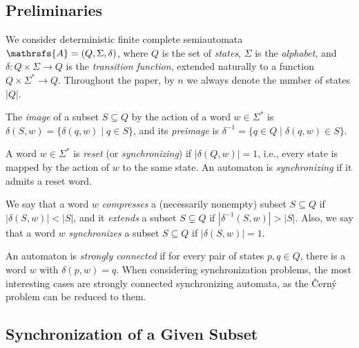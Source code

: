 
\newcommand{\Cerny}{\v{C}ern{\'y}\xspace}
\newtheorem{theorem}{Theorem}
\newtheorem{conjecture}[theorem]{Conjecture}

\subsection{Preliminaries}

We consider deterministic finite complete semiautomata $\mathrsfs{A}=(Q,\Sigma,\delta)$, where $Q$ is the set of \emph{states}, $\Sigma$ is the \emph{alphabet}, and $\delta\colon Q \times \Sigma \to Q$ is the \emph{transition function}, extended naturally to a function $Q \times \Sigma^* \to Q$.
Throughout the paper, by $n$ we always denote the number of states $|Q|$.

The \emph{image} of a subset $S \subseteq Q$ by the action of a word $w \in \Sigma^*$ is $\delta(S,w) = \{\delta(q,w) \mid q \in S\}$, and its \emph{preimage} is $\delta^{-1} = \{q \in Q \mid \delta(q,w) \in S\}$.

A word $w \in \Sigma^*$ is \emph{reset} (or \emph{synchronizing}) if $|\delta(Q,w)|=1$, i.e., every state is mapped by the action of $w$ to the same state.
An automaton is \emph{synchronizing} if it admits a reset word.

We say that a word $w$ \emph{compresses} a (necessarily nonempty) subset $S \subseteq Q$ if $|\delta(S,w)|<|S|$, and it \emph{extends} a subset $S \subsetneq Q$ if $|\delta^{-1}(S,w)|>|S|$.
Also, we say that a word $w$ \emph{synchronizes} a subset $S \subseteq Q$ if $|\delta(S,w)|=1$.

An automaton is \emph{strongly connected} if for every pair of states $p,q \in Q$, there is a word $w$ with $\delta(p,w) = q$.
When considering synchronization problems, the most interesting cases are strongly connected synchronizing automata, as the \Cerny problem can be reduced to them.

\subsection{Synchronization of a Given Subset}


